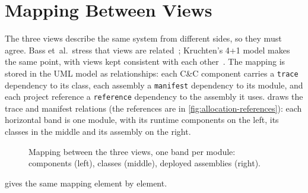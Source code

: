 \documentclass[../main-en.tex]{subfiles}
\begin{document}
\section{Mapping Between Views}
\label{sec:mapping}

The three views describe the same system from different sides, so they must
agree. Bass et~al.\ stress that views are related~\cite{bass_software_2021};
Kruchten's 4+1 model makes the same point, with views kept consistent with
each other~\cite{kruchten_4plus1_1995}. The mapping is stored in the UML
model as relationships: each C\&C component carries a \texttt{trace}
dependency to its class, each assembly a \texttt{manifest} dependency to its
module, and each project reference a \texttt{reference} dependency to the
assembly it uses.  draws the trace and manifest relations (the references are in \cref{fig:allocation-references}): each horizontal
band is one module, with its runtime components on the left, its classes in
the middle and its assembly on the right.

\begin{figure}[htbp]
  \centering
  \caption{Mapping between the three views, one band per module: components
  (left), classes (middle), deployed assemblies (right).}
  \label{fig:view-mapping}
\end{figure}

 gives the same mapping element by element.
\end{document}
